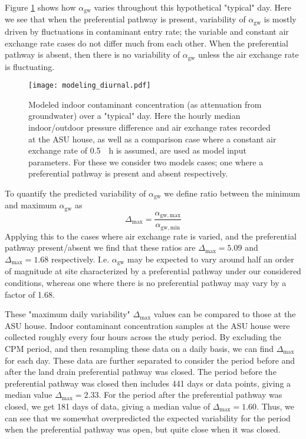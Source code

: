 Figure \ref{fig:model_diurnal} shows how $\alpha_\mathrm{gw}$ varies throughout this hypothetical "typical" day.
Here we see that when the preferential pathway is present, variability of $\alpha_\mathrm{gw}$ is mostly driven by fluctuations in contaminant entry rate; the variable and constant air exchange rate cases do not differ much from each other.
When the preferential pathway is absent, then there is no variability of $\alpha_\mathrm{gw}$ unless the air exchange rate is fluctuating.\par

\begin{figure}[htb!]
  \centering
  \texttt{[image: modeling\_diurnal.pdf]}
  \caption{Modeled indoor contaminant concentration (as attenuation from groundwater) over a "typical" day. Here the hourly median indoor/outdoor pressure difference and air exchange rates recorded at the ASU house, as well as a comparison case where a constant air exchange rate of \SI{0.5}{\per\hour} is assumed, are used as model input parameters. For these we consider two models cases; one where a preferential pathway is present and absent respectively.}
  \label{fig:model_diurnal}
\end{figure}

To quantify the predicted variability of $\alpha_\mathrm{gw}$ we define ratio between the minimum and maximum $\alpha_\mathrm{gw}$ as
\begin{equation}
  \Delta_\mathrm{max} = \frac{\alpha_\mathrm{gw,max}}{\alpha_\mathrm{gw,min}}
\end{equation}
Applying this to the cases where air exchange rate is varied, and the preferential pathway present/absent we find that these ratios are $\Delta_\mathrm{max} = 5.09$ and $\Delta_\mathrm{max} = 1.68$ respectively.
I.e. $\alpha_\mathrm{gw}$ may be expected to vary around half an order of magnitude at site characterized by a preferential pathway under our considered conditions, whereas one where there is no preferential pathway may vary by a factor of 1.68.\par

These "maximum daily variability" $\Delta_\mathrm{max}$ values can be compared to those at the ASU house.
Indoor contaminant concentration samples at the ASU house were collected roughly every four hours across the study period.
By excluding the CPM period, and then resampling these data on a daily basis, we can find $\Delta_\mathrm{max}$ for each day.
These data are further separated to consider the period before and after the land drain preferential pathway was closed.
The period before the preferential pathway was closed then includes 441 days or data points, giving a median value $\Delta_\mathrm{max} = 2.33$.
For the period after the preferential pathway was closed, we get 181 days of data, giving a median value of $\Delta_\mathrm{max} = 1.60$.
Thus, we can see that we somewhat overpredicted the expected variability for the period when the preferential pathway was open, but quite close when it was closed.\par

